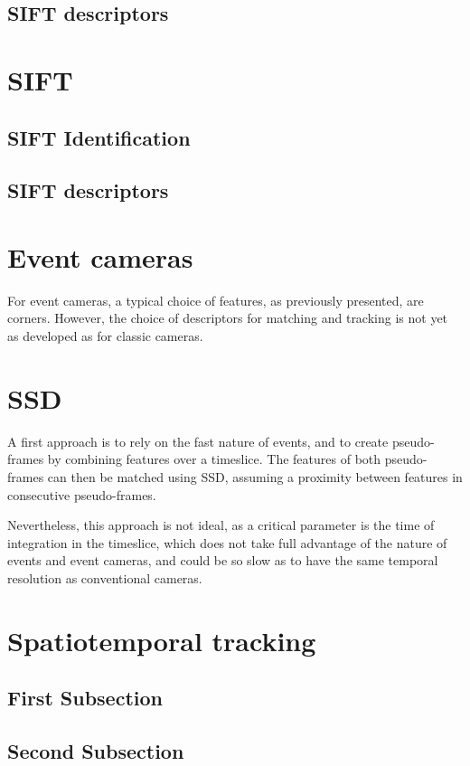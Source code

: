 \documentclass[10pt,onecolumn]{IEEEtran}
\begin{document}
\subsection{SIFT descriptors}


\section{SIFT}



\subsection{SIFT Identification}



\subsection{SIFT descriptors}

\section{Event cameras}

For event cameras, a typical choice of features, as previously presented, are corners. However, the choice of descriptors for matching and tracking is not yet as developed as for classic cameras.

\section{SSD}

A first approach is to rely on the fast nature of events, and to create pseudo-frames by combining features over a timeslice. The features of both pseudo-frames can then be matched using SSD, assuming a proximity between features in consecutive pseudo-frames. 

Nevertheless, this approach is not ideal, as a critical parameter is the time of integration in the timeslice, which does not take full advantage of the nature of events and event cameras, and could be so slow as to have the same temporal resolution as conventional cameras.

\section{Spatiotemporal tracking}
\subsection{First Subsection}

\subsection{Second Subsection}




\end{document}
